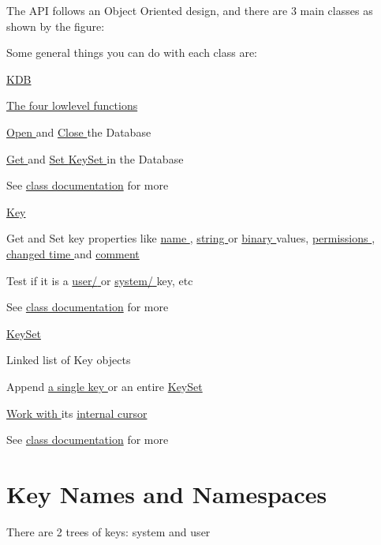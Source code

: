 The A\-P\-I follows an Object Oriented design, and there are 3 main classes as shown by the figure\-:

 Some general things you can do with each class are\-:

\hyperlink{group__kdb}{K\-D\-B }
\begin{DoxyItemize}
\item \hyperlink{group__kdb}{The four lowlevel functions }
\item \hyperlink{group__kdb_ga6808defe5870f328dd17910aacbdc6ca}{Open } and \hyperlink{group__kdb_gadb54dc9fda17ee07deb9444df745c96f}{Close } the Database
\item \hyperlink{group__kdb_ga28e385fd9cb7ccfe0b2f1ed2f62453a1}{Get } and \hyperlink{group__kdb_ga11436b058408f83d303ca5e996832bcf}{Set } \hyperlink{group__keyset}{Key\-Set } in the Database
\item See \hyperlink{group__kdb}{class documentation} for more
\end{DoxyItemize}

\hyperlink{group__key}{Key }
\begin{DoxyItemize}
\item Get and Set key properties like \hyperlink{group__keyname_ga7699091610e7f3f43d2949514a4b35d9}{name }, \hyperlink{group__keyvalue_ga622bde1eb0e0c4994728331326340ef2}{string } or \hyperlink{group__keyvalue_gaa50a5358fd328d373a45f395fa1b99e7}{binary } values, \hyperlink{group__keymeta_gabc0cec592ce3b77e9bc33dbc8e8f6bdc}{permissions }, \hyperlink{group__keymeta_ga57689eb5691679071463b777ae786ae9}{changed time } and \hyperlink{group__keyvalue_gafb89735689929ff717cc9f2d0d0b46a2}{comment }
\item Test if it is a \hyperlink{group__keytest_ga373acc20c6209357045891f4b0c70041}{{\ttfamily user/} } or \hyperlink{group__keytest_gafe49cfb61c2accb3073131c23a56fb14}{{\ttfamily system/} } key, etc
\item See \hyperlink{group__key}{class documentation} for more
\end{DoxyItemize}

\hyperlink{group__keyset}{Key\-Set }
\begin{DoxyItemize}
\item Linked list of Key objects
\item Append \hyperlink{group__keyset_gaa5a1d467a4d71041edce68ea7748ce45}{a single key } or an entire \hyperlink{group__keyset_ga21eb9c3a14a604ee3a8bdc779232e7b7}{Key\-Set }
\item \hyperlink{group__keyset_ga317321c9065b5a4b3e33fe1c399bcec9}{Work with } its \hyperlink{group__keyset_ga4287b9416912c5f2ab9c195cb74fb094}{internal cursor }
\item See \hyperlink{group__keyset}{class documentation} for more
\end{DoxyItemize}\hypertarget{index_keynames}{}\section{Key Names and Namespaces}\label{index_keynames}
There are 2 trees of keys\-: {\ttfamily system} and {\ttfamily user} 



